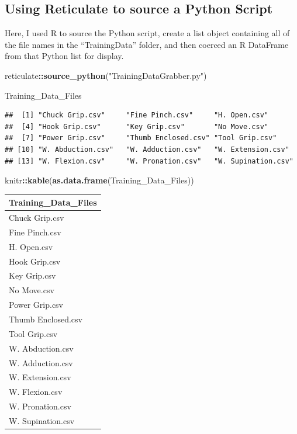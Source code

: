 \documentclass[]{article}
\newenvironment{Shaded}{\begin{snugshade}}{\end{snugshade}}
\newcommand{\KeywordTok}[1]{\textcolor[rgb]{0.13,0.29,0.53}{\textbf{#1}}}
\newcommand{\StringTok}[1]{\textcolor[rgb]{0.31,0.60,0.02}{#1}}
\newcommand{\OperatorTok}[1]{\textcolor[rgb]{0.81,0.36,0.00}{\textbf{#1}}}
\newcommand{\NormalTok}[1]{#1}
\begin{document}
\subsection{Using Reticulate to source a Python
Script}\label{using-reticulate-to-source-a-python-script}

Here, I used R to source the Python script, create a list object
containing all of the file names in the ``TrainingData'' folder, and
then coerced an R DataFrame from that Python list for display.

\begin{Shaded}
\begin{Highlighting}[]
\NormalTok{reticulate}\OperatorTok{::}\KeywordTok{source_python}\NormalTok{(}\StringTok{"TrainingDataGrabber.py"}\NormalTok{)}

\NormalTok{Training_Data_Files}
\end{Highlighting}
\end{Shaded}

\begin{verbatim}
##  [1] "Chuck Grip.csv"     "Fine Pinch.csv"     "H. Open.csv"       
##  [4] "Hook Grip.csv"      "Key Grip.csv"       "No Move.csv"       
##  [7] "Power Grip.csv"     "Thumb Enclosed.csv" "Tool Grip.csv"     
## [10] "W. Abduction.csv"   "W. Adduction.csv"   "W. Extension.csv"  
## [13] "W. Flexion.csv"     "W. Pronation.csv"   "W. Supination.csv"
\end{verbatim}

\begin{Shaded}
\begin{Highlighting}[]
\NormalTok{knitr}\OperatorTok{::}\KeywordTok{kable}\NormalTok{(}\KeywordTok{as.data.frame}\NormalTok{(Training_Data_Files))}
\end{Highlighting}
\end{Shaded}

\begin{longtable}[]{@{}l@{}}
\toprule
Training\_Data\_Files\tabularnewline
\midrule
\endhead
Chuck Grip.csv\tabularnewline
Fine Pinch.csv\tabularnewline
H. Open.csv\tabularnewline
Hook Grip.csv\tabularnewline
Key Grip.csv\tabularnewline
No Move.csv\tabularnewline
Power Grip.csv\tabularnewline
Thumb Enclosed.csv\tabularnewline
Tool Grip.csv\tabularnewline
W. Abduction.csv\tabularnewline
W. Adduction.csv\tabularnewline
W. Extension.csv\tabularnewline
W. Flexion.csv\tabularnewline
W. Pronation.csv\tabularnewline
W. Supination.csv\tabularnewline
\bottomrule
\end{longtable}
\end{document}
